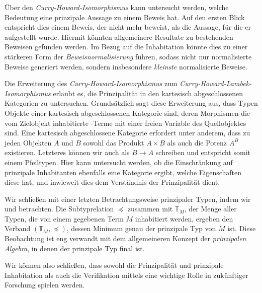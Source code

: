 Über den \emph{Curry-Howard-Isomorphismus} kann untersucht werden, welche Bedeutung eine prinzipale Aussage zu einem Beweis hat. Auf den ersten Blick entspricht dies einem Beweis, der nicht mehr beweist, als die Aussage, für die er aufgestellt wurde. Hiermit könnten allgemeinere Resultate zu bestehenden Beweisen gefunden werden. Im Bezug auf die Inhabitation könnte dies zu einer stärkeren Form der \emph{Beweisnormalisierung}\cite{lecturesCH} führen, sodass nicht nur normalisierte Beweise generiert werden, sondern insbesondere \emph{kleinste} normalisierte Beweise.

Die Erweiterung des \emph{Curry-Howard-Isomorphismus} zum \emph{Curry-Howard-Lambek-Isomorphismus}\cite{ccc} erlaubt es, die Prinzipalität in den kartesisch abgeschlossenen Kategorien zu untersuchen. Grundsätzlich sagt diese Erweiterung aus, dass Typen Objekte einer kartesisch abgeschlossenen Kategorie sind, deren Morphismen die vom Zielobjekt inhabitierte \tlambda-Terme mit einer freien Variable des Quellobjektes sind. Eine kartesisch abgeschlossene Kategorie erfordert unter anderem, dass zu jeden Objekten $A$ und $B$ sowohl das Produkt $A\times B$ als auch die Potenz $A^B$ existieren. Letzteres können wir auch als $B \to A$ schreiben und entspricht somit einem Pfeiltypen. Hier kann untersucht werden, ob die Einschränkung auf prinzipale Inhabitanten ebenfalls eine Kategorie ergibt, welche Eigenschaften diese hat, und inwieweit dies dem Verständnis der Prinzipalität dient.

Wir schließen mit einer letzten Betrachtungsweise prinzipaler Typen, indem wir  und  betrachten. Die Subtyprelation $\preceq$ zusammen mit $\mathbb{T}_M$, der Menge aller Typen, die von einem gegebenen Term $M$ inhabitiert werden, ergeben den Verband $(\mathbb{T}_M, \preceq)$, dessen Minimum genau der prinzipale Typ von $M$ ist. Diese Beobachtung ist eng verwandt mit dem allgemeineren Konzept der \emph{prinzipalen Algebra}\cite{henk}, in denen der prinzipale Typ final ist.

Wir können also schließen, dass sowohl die Prinzipalität und prinzipale Inhabitation als auch die Verifikation mittels \coq{} eine wichtige Rolle in zukünftiger Forschung spielen werden.